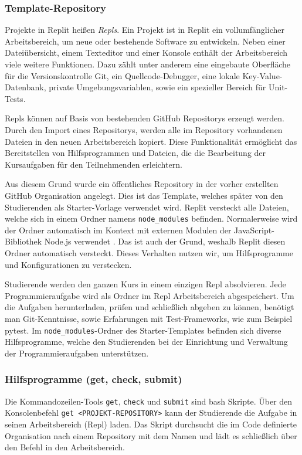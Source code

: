 \subsubsection{Template-Repository}\label{replit-template-repository}
Projekte in Replit heißen \emph{Repls}. Ein Projekt ist in Replit ein
vollumfänglicher Arbeitsbereich, um neue oder bestehende Software zu entwickeln.
Neben einer Dateiübersicht, einem Texteditor und einer Konsole enthält der
Arbeitsbereich viele weitere Funktionen. Dazu zählt unter anderem eine
eingebaute Oberfläche für die Versionskontrolle Git, ein Quellcode-Debugger,
eine lokale Key-Value-Datenbank, private Umgebungsvariablen, sowie ein
spezieller Bereich für Unit-Tests.

Repls können auf Basis von bestehenden GitHub Repositorys erzeugt werden. Durch
den Import eines Repositorys, werden alle im Repository vorhandenen Dateien
in den neuen Arbeitsbereich kopiert. Diese Funktionalität ermöglicht das
Bereitstellen von Hilfsprogrammen und Dateien, die die Bearbeitung der
Kursaufgaben für den Teilnehmenden erleichtern.

Aus diesem Grund wurde ein öffentliches Repository in der vorher erstellten
GitHub Organisation angelegt. Dies ist das Template, welches später von den
Studierenden als Starter-Vorlage verwendet wird.
\parencite{git-repo:replit-template} Replit versteckt alle Dateien, welche sich
in einem Ordner namens \texttt{node\_modules} befinden. Normalerweise wird der
Ordner automatisch im Kontext mit externen Modulen der JavaScript-Bibliothek
Node.js verwendet \parencite{nodejs}. Das ist auch der Grund, weshalb Replit
diesen Ordner automatisch versteckt. Dieses Verhalten nutzen wir, um
Hilfsprogramme und Konfigurationen zu verstecken.

Studierende werden den ganzen Kurs in einem einzigen Repl absolvieren. Jede
Programmieraufgabe wird als Ordner im Repl Arbeitsbereich abgespeichert. Um die
Aufgaben herunterladen, prüfen und schließlich abgeben zu können, benötigt man
Git-Kenntnisse, sowie Erfahrungen mit Test-Frameworks, wie zum Beispiel pytest.
Im \texttt{node\_modules}-Ordner des Starter-Templates befinden sich diverse
Hilfsprogramme, welche den Studierenden bei der Einrichtung und Verwaltung der
Programmieraufgaben unterstützen.

\subsubsection{Hilfsprogramme (get, check, submit)}
\label{replit-template-wrapper-tools}
Die Kommandozeilen-Tools \texttt{get}, \texttt{check} und \texttt{submit} sind
\ac{bash} Skripte. Über den Konsolenbefehl \texttt{get <PROJEKT-REPOSITORY>}
kann der Studierende die Aufgabe in seinen Arbeitsbereich (Repl) laden. Das
Skript durchsucht die im Code definierte Organisation nach einem Repository mit
dem Namen und lädt es schließlich über den Befehl  in den
Arbeitsbereich.

